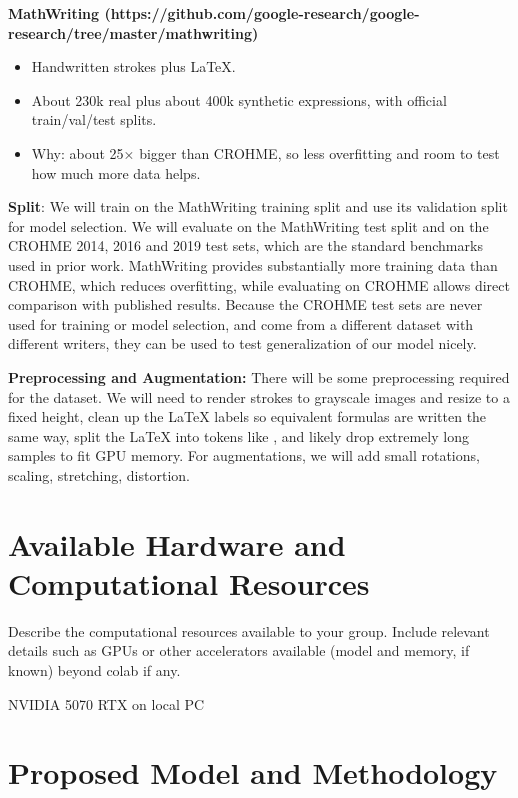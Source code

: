 \documentclass[11pt]{article}
\newcommand{\blue}[1]{\textcolor{cyan!60!black}{#1}}
\begin{document}
\blue{
\textbf{MathWriting (https://github.com/google-research/google-research/tree/master/mathwriting)}
\begin{itemize}
    \item Handwritten strokes plus LaTeX.
    \item About 230k real plus about 400k synthetic expressions, with official train/val/test splits.
    \item Why: about 25× bigger than CROHME, so less overfitting and room to test how much more data helps.
\end{itemize}
}

\blue{
\textbf{Split}: We will train on the MathWriting training split and use its validation split for model selection.
We will evaluate on the MathWriting test split and on the CROHME 2014, 2016 and 2019 test sets, which are the standard
benchmarks used in prior work. MathWriting provides substantially more training data than CROHME, which reduces
overfitting, while evaluating on CROHME allows direct comparison with published results. Because the CROHME test
sets are never used for training or model selection, and come from a different dataset with different writers,
they can be used to test generalization of our model nicely.
}

\blue{
\textbf{Preprocessing and Augmentation:}
There will be some preprocessing required for the dataset. We will need to render strokes to grayscale images and resize to a fixed height, clean up the LaTeX labels so equivalent formulas are written the same way, split the LaTeX into tokens like \texttt{\detokenize{\frac, \{, x, ^}}, and likely drop extremely long samples to fit GPU memory. For augmentations, we will add small rotations, scaling, stretching, distortion.
}

\section{Available Hardware and Computational Resources}

Describe the computational resources available to your group. Include relevant details such as GPUs or other accelerators available (model and memory, if known) beyond colab if any.

\blue{
    NVIDIA 5070 RTX on local PC
}

\section{Proposed Model and Methodology}
\end{document}
